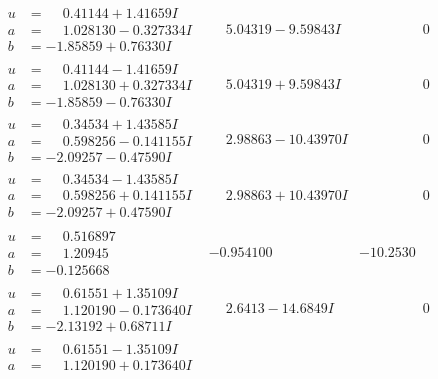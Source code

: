 \documentclass[1p]{elsarticle_modified}
\theoremstyle{definition}
\begin{document}
$$\begin{array}{c|c|c}
\begin{aligned}
u &= \phantom{-}0.41144 + 1.41659 I \\
a &= \phantom{-}1.028130 - 0.327334 I \\
b &= -1.85859 + 0.76330 I\end{aligned}
 & \phantom{-}5.04319 - 9.59843 I & \phantom{-0.000000 } 0 \\ \hline\begin{aligned}
u &= \phantom{-}0.41144 - 1.41659 I \\
a &= \phantom{-}1.028130 + 0.327334 I \\
b &= -1.85859 - 0.76330 I\end{aligned}
 & \phantom{-}5.04319 + 9.59843 I & \phantom{-0.000000 } 0 \\ \hline\begin{aligned}
u &= \phantom{-}0.34534 + 1.43585 I \\
a &= \phantom{-}0.598256 - 0.141155 I \\
b &= -2.09257 - 0.47590 I\end{aligned}
 & \phantom{-}2.98863 - 10.43970 I & \phantom{-0.000000 } 0 \\ \hline\begin{aligned}
u &= \phantom{-}0.34534 - 1.43585 I \\
a &= \phantom{-}0.598256 + 0.141155 I \\
b &= -2.09257 + 0.47590 I\end{aligned}
 & \phantom{-}2.98863 + 10.43970 I & \phantom{-0.000000 } 0 \\ \hline\begin{aligned}
u &= \phantom{-}0.516897\phantom{ +0.000000I} \\
a &= \phantom{-}1.20945\phantom{ +0.000000I} \\
b &= -0.125668\phantom{ +0.000000I}\end{aligned}
 & -0.954100\phantom{ +0.000000I} & -10.2530\phantom{ +0.000000I} \\ \hline\begin{aligned}
u &= \phantom{-}0.61551 + 1.35109 I \\
a &= \phantom{-}1.120190 - 0.173640 I \\
b &= -2.13192 + 0.68711 I\end{aligned}
 & \phantom{-}2.6413 - 14.6849 I & \phantom{-0.000000 } 0 \\ \hline\begin{aligned}
u &= \phantom{-}0.61551 - 1.35109 I \\
a &= \phantom{-}1.120190 + 0.173640 I \\

\end{aligned}
\end{array}$$
\end{document}
